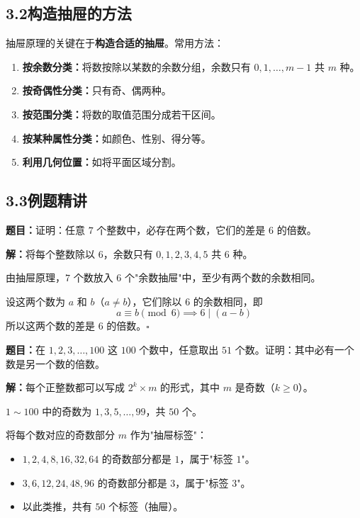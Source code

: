 \documentclass[12pt, a4paper]{ctexart}
\begin{document}
\subsection*{3.2\quad 构造抽屉的方法}

\begin{tipbox}[构造抽屉的常用策略]
抽屉原理的关键在于\textbf{构造合适的抽屉}。常用方法：
\begin{enumerate}[itemsep=2pt]
  \item \textbf{按余数分类：}将数按除以某数的余数分组，余数只有 $0,1,\ldots,m-1$ 共 $m$ 种。
  \item \textbf{按奇偶性分类：}只有奇、偶两种。
  \item \textbf{按范围分类：}将数的取值范围分成若干区间。
  \item \textbf{按某种属性分类：}如颜色、性别、得分等。
  \item \textbf{利用几何位置：}如将平面区域分割。
\end{enumerate}
\end{tipbox}

\subsection*{3.3\quad 例题精讲}

\begin{examplebox}[【例7】余数抽屉]
\textbf{题目：}证明：任意 $7$ 个整数中，必存在两个数，它们的差是 $6$ 的倍数。
\end{examplebox}

\textbf{解：}\;将每个整数除以 $6$，余数只有 $0,1,2,3,4,5$ 共 $6$ 种。

由抽屉原理，$7$ 个数放入 $6$ 个"余数抽屉"中，至少有两个数的余数相同。

设这两个数为 $a$ 和 $b$（$a\neq b$），它们除以 $6$ 的余数相同，即
\[a\equiv b\pmod{6}\implies 6\mid (a-b)\]
所以这两个数的差是 $6$ 的倍数。\hfill$\square$

\begin{examplebox}[【例8】范围抽屉]
\textbf{题目：}在 $1,2,3,\ldots,100$ 这 $100$ 个数中，任意取出 $51$ 个数。证明：其中必有一个数是另一个数的倍数。
\end{examplebox}

\textbf{解：}\;每个正整数都可以写成 $2^k\times m$ 的形式，其中 $m$ 是奇数（$k\geqslant 0$）。

$1\sim 100$ 中的奇数为 $1,3,5,\ldots,99$，共 $50$ 个。

将每个数对应的奇数部分 $m$ 作为"抽屉标签"：
\begin{itemize}[itemsep=1pt]
  \item $1,2,4,8,16,32,64$ 的奇数部分都是 $1$，属于"标签 $1$"。
  \item $3,6,12,24,48,96$ 的奇数部分都是 $3$，属于"标签 $3$"。
  \item 以此类推，共有 $50$ 个标签（抽屉）。
\end{itemize}
\end{document}

